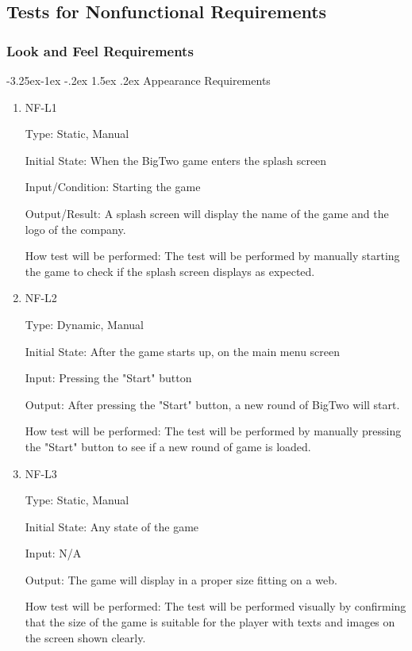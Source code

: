 \documentclass[12pt, titlepage]{article}
\makeatletter
\renewcommand\paragraph{\@startsection{paragraph}{4}{\z@}%
                                     {-3.25ex\@plus -1ex \@minus -.2ex}%
                                     {1.5ex \@plus .2ex}%
                                     {\normalfont\normalsize\bfseries}}
\makeatother
\begin{document}
\subsection{Tests for Nonfunctional Requirements}
\subsubsection{Look and Feel Requirements}
\paragraph{Appearance Requirements}
\begin{enumerate}

\item{NF-L1\\}

Type: Static, Manual
					
Initial State: When the BigTwo game enters the splash screen
					
Input/Condition: Starting the game
					
Output/Result: A splash screen will display the name of the game and the logo of the company.
					
How test will be performed: The test will be performed by manually starting the game to check if the splash screen displays as expected. 

\item{NF-L2\\}

Type: Dynamic, Manual
					
Initial State: After the game starts up, on the main menu screen
					
Input: Pressing the "Start" button
					
Output: After pressing the "Start" button, a new round of BigTwo will start.
					
How test will be performed: The test will be performed by manually pressing the "Start" button to see if a new round of game is loaded. 
					
\item{NF-L3\\}

Type: Static, Manual
					
Initial State: Any state of the game
					
Input: N/A
					
Output: The game will display in a proper size fitting on a web.
					
How test will be performed: The test will be performed visually by confirming that the size of the game is suitable for the player with texts and images on the screen shown clearly.


\end{enumerate}
\end{document}
